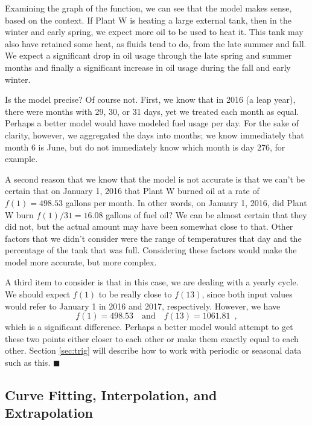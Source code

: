 Examining the graph of the function, we can see that the model makes sense, based on the context. If Plant W is heating a large external tank, then in the winter and early spring, we expect more oil to be used to heat it. This tank may also have retained some heat, as fluids tend to do, from the late summer and fall. We expect a significant drop in oil usage through the late spring and summer months and finally a significant increase in oil usage during the fall and early winter.

Is the model precise? Of course not. First, we know that in 2016 (a leap year), there were months with 29, 30, or 31 days, yet we treated each month as equal. Perhaps a better model would have modeled fuel usage per day. For the sake of clarity, however, we aggregated the days into months; we know immediately that month 6 is June, but do not immediately know which month is day 276, for example.

A second reason that we know that the model is not accurate is that we can't be certain that on January 1, 2016 that Plant W burned oil at a rate of $f(1) = 498.53$ gallons per month. In other words, on January 1, 2016, did Plant W burn $f(1)/31 = 16.08$ gallons of fuel oil? We can be almost certain that they did not, but the actual amount may have been somewhat close to that. Other factors that we didn't consider were the range of temperatures that day and the percentage of the tank that was full. Considering these factors would make the model more accurate, but more complex.

A third item to consider is that in this case, we are dealing with a yearly cycle. We should expect $f(1)$ to be really close to $f(13)$, since both input values would refer to January 1 in 2016 and 2017, respectively. However, we have
$$ f(1) = 498.53 \quad \mbox{and} \quad f(13) = 1061.81 \enspace ,$$
which is a significant difference. Perhaps a better model would attempt to get these two points either closer to each other or make them exactly equal to each other. Section \ref{sec:trig} will describe how to work with periodic or seasonal data such as this. \hfill$\blacksquare$

\subsection{Curve Fitting, Interpolation, and Extrapolation}
\label{ssec:cfie}

